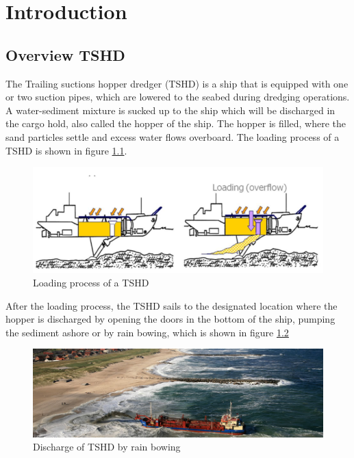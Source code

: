 
\chapter{Introduction}

\section{Overview TSHD}

The Trailing suctions hopper dredger (TSHD) is a ship that is equipped with one or two suction pipes, which are lowered to the seabed during dredging operations. A water-sediment mixture is sucked up to the ship which will be discharged in the cargo hold, also called the hopper of the ship. The hopper is filled, where the sand particles settle and excess water flows overboard. The loading process of a TSHD is shown in figure \ref{fig:loading}\citep{Lecture}.\newline

\begin{figure}[ht!]
    \centering
    \includegraphics[width=0.8\linewidth]{Images/TSHD_loading.png}
    \caption{Loading process of a TSHD}
    \label{fig:loading}
\end{figure}
\noindent
After the loading process, the TSHD sails to the designated location where the hopper is discharged by opening the doors in the bottom of the ship, pumping the sediment ashore or by rain bowing, which is shown in figure \ref{fig:Rainbow}

\begin{figure}[ht!]
    \centering
    \includegraphics[width=0.8\linewidth]{Images/Rainbow.jpg}
    \caption{Discharge of TSHD by rain bowing}
    \label{fig:Rainbow}
\end{figure}

